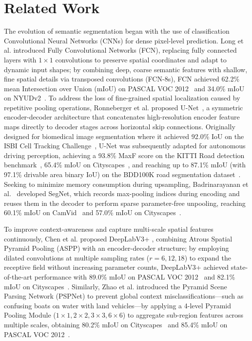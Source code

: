 \documentclass[a4paper]{report}
\begin{document}
\section{Related Work}
\label{sec:related_work}

The evolution of semantic segmentation began with the use of classification Convolutional Neural Networks (CNNs) for dense pixel-level prediction. Long et al. introduced Fully Convolutional Networks (FCN)\cite{long2015fcn}, replacing fully connected layers with $1\times1$ convolutions to preserve spatial coordinates and adapt to dynamic input shapes; by combining deep, coarse semantic features with shallow, fine spatial details via transposed convolutions (FCN-8s), FCN achieved 62.2\% mean Intersection over Union (mIoU) on PASCAL VOC 2012~\cite{everingham2012pascal} and 34.0\% mIoU on NYUDv2~\cite{silberman2012indoor}. To address the loss of fine-grained spatial localization caused by repetitive pooling operations, Ronneberger et al. proposed U-Net~\cite{ronneberger2015unet}, a symmetric encoder-decoder architecture that concatenates high-resolution encoder feature maps directly to decoder stages across horizontal skip connections. Originally designed for biomedical image segmentation where it achieved 92.0\% IoU on the ISBI Cell Tracking Challenge~\cite{maska2014isbi}, U-Net was subsequently adapted for autonomous driving perception, achieving a 93.8\% MaxF score on the KITTI Road detection benchmark~\cite{fritsch2013kitti}, 65.4\% mIoU on Cityscapes~\cite{cordts2016cityscapes}, and reaching up to 87.1\% mIoU (with 97.1\% drivable area binary IoU) on the BDD100K road segmentation dataset~\cite{bdd100k2020, wu2022yolop}. Seeking to minimize memory consumption during upsampling, Badrinarayanan et al.~\cite{badrinarayanan2017segnet} developed SegNet, which records max-pooling indices during encoding and reuses them in the decoder to perform sparse parameter-free unpooling, reaching 60.1\% mIoU on CamVid~\cite{brostow2009camvid} and 57.0\% mIoU on Cityscapes~\cite{cordts2016cityscapes}.

To improve context-awareness and capture multi-scale spatial features continuously, Chen et al. proposed DeepLabV3+ \cite{chen2018deeplabv3plus}, combining Atrous Spatial Pyramid Pooling (ASPP) with an encoder-decoder structure; by employing dilated convolutions at multiple sampling rates ($r = 6, 12, 18$) to expand the receptive field without increasing parameter counts, DeepLabV3+ achieved state-of-the-art performance with 89.0\% mIoU on PASCAL VOC 2012~\cite{everingham2012pascal} and 82.1\% mIoU on Cityscapes~\cite{cordts2016cityscapes}. Similarly, Zhao et al. introduced the Pyramid Scene Parsing Network (PSPNet) \cite{zhao2017pspnet} to prevent global context misclassifications—such as confusing boats on water with land vehicles—by applying a 4-level Pyramid Pooling Module ($1\times1, 2\times2, 3\times3, 6\times6$) to aggregate sub-region features across multiple scales, obtaining 80.2\% mIoU on Cityscapes~\cite{cordts2016cityscapes} and 85.4\% mIoU on PASCAL VOC 2012~\cite{everingham2012pascal}.
\end{document}
